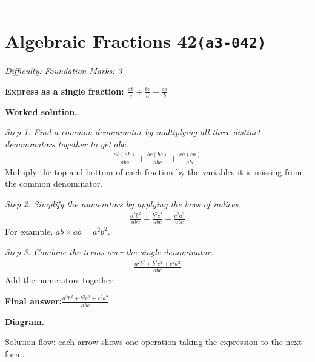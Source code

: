 \documentclass[11pt]{article}
\newcommand{\question}[1]{\par\medskip\noindent\textbf{#1}\par}
\begin{document}
\medskip\hrule

\section*{Algebraic Fractions 42\quad\small\texttt{(a3-042)}}
\textit{Difficulty: Foundation \quad\textbar\quad Marks: 3}

\question{Express as a single fraction: \( \frac{ab}{c} + \frac{bc}{a} + \frac{ca}{b} \)}

\textbf{Worked solution.}

\textit{Step 1: Find a common denominator by multiplying all three distinct denominators together to get \( abc \).}
\[\begin{gathered}
\frac{ab(ab)}{abc} + \frac{bc(bc)}{abc} + \frac{ca(ca)}{abc}
\end{gathered}\]
Multiply the top and bottom of each fraction by the variables it is missing from the common denominator.

\textit{Step 2: Simplify the numerators by applying the laws of indices.}
\[\begin{gathered}
\frac{a^2b^2}{abc} + \frac{b^2c^2}{abc} + \frac{c^2a^2}{abc}
\end{gathered}\]
For example, \( ab \times ab = a^2b^2 \).

\textit{Step 3: Combine the terms over the single denominator.}
\[\begin{gathered}
\frac{a^2b^2 + b^2c^2 + c^2a^2}{abc}
\end{gathered}\]
Add the numerators together.

\begin{answerbox}
\textbf{Final answer:}\quad \(\displaystyle \frac{a^2b^2 + b^2c^2 + c^2a^2}{abc}\)
\end{answerbox}
\textbf{Diagram.}

\begin{center}
\end{center}
\small Solution flow: each arrow shows one operation taking the expression to the next form.\normalsize
\end{document}
